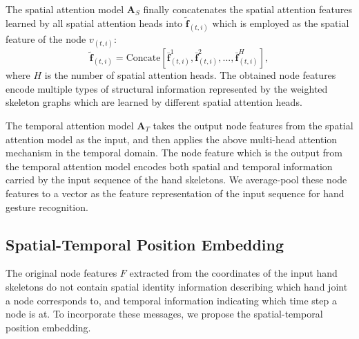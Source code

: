 \documentclass{bmvc2k}
\begin{document}
The spatial attention model $\mathbf{A}_S$ finally concatenates the spatial attention features learned by all spatial attention heads into $\tilde{\mathbf{f}}_{(t,i)}$ which is employed as the spatial feature of the node $v_{(t,i)}$:
\begin{equation}
\label{eq:mutil}
\tilde{\textbf{f}}_{(t,i)} = \text{Concate}\left[\bar{\textbf{f}}_{(t,i)}^{1}, \bar{\textbf{f}}_{(t,i)}^{2}, ..., \bar{\textbf{f}}_{(t,i)}^{H}\right],
\end{equation}
where $H$ is the number of spatial attention heads. 
The obtained node features encode multiple types of structural information represented by the weighted skeleton graphs which are learned by different spatial attention heads. 

The temporal attention model $\mathbf{A}_T$ takes the output node features from the spatial attention model as the input, and then applies the above multi-head attention mechanism in the temporal domain. The node feature which is the output from the temporal attention model encodes both spatial and temporal information carried by the input sequence of the hand skeletons. We average-pool these node features to a vector as the feature representation of the input sequence for hand gesture recognition.


































\subsection{Spatial-Temporal Position Embedding}
\label{sec:pos_embedding}



The original node features $F$ extracted from the coordinates of the input hand skeletons do not contain spatial identity information describing which hand joint a node corresponds to, and temporal information indicating which time step a node is at. To incorporate these messages, we propose the spatial-temporal position embedding.
\end{document}
